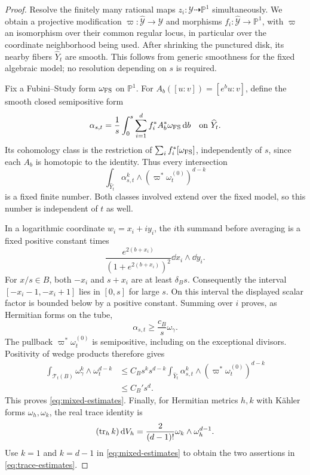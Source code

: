 \begin{proof}
Resolve the finitely many rational maps $z_i:\mathcal Y\dashrightarrow
\mathbb P^1$ simultaneously.  We obtain a projective modification
$\varpi:\widehat{\mathcal Y}\to\mathcal Y$ and morphisms
$f_i:\widehat{\mathcal Y}\to\mathbb P^1$, with $\varpi$ an isomorphism
over their common regular locus, in particular over the coordinate
neighborhood being used.  After shrinking the punctured disk, its
nearby fibers $\widehat Y_t$ are smooth.  This follows from generic
smoothness for the fixed algebraic model; no resolution depending on
$s$ is required.

Fix a Fubini--Study form $\omega_{\rm FS}$ on $\mathbb P^1$.  For
$A_b([u:v])=[e^bu:v]$, define the smooth closed semipositive form
\[
 \alpha_{s,t}=\frac1s\int_0^s\sum_{i=1}^d
                f_i^* A_b^*\omega_{\rm FS}\,\mathrm d b
 \quad\hbox{on }\widehat Y_t.
\]
Its cohomology class is the restriction of
$\sum_i f_i^*[\omega_{\rm FS}]$, independently of $s$, since each $A_b$
is homotopic to the identity.  Thus every intersection
\begin{equation}
 \int_{\widehat Y_t}\alpha_{s,t}^k\wedge
                  (\varpi^*\omega_t^{(0)})^{d-k}
 \label{eq:fixed-mixed-intersection}
\end{equation}
is a fixed finite number.  Both classes involved extend over the fixed
model, so this number is independent of $t$ as well.

In a logarithmic coordinate $w_i=x_i+iy_i$, the $i$th summand before
averaging is a fixed positive constant times
\[
 \frac{e^{2(b+x_i)}}{(1+e^{2(b+x_i)})^2}
                   \dd x_i\wedge\dd y_i.
\]
For $x/s\in B$, both $-x_i$ and $s+x_i$ are at least
$\delta_Bs$.  Consequently the interval
$[-x_i-1,-x_i+1]$ lies in $[0,s]$ for large $s$.  On this interval the
displayed scalar factor is bounded below by a positive constant.
Summing over $i$ proves, as Hermitian forms on the tube,
\[
 \alpha_{s,t}\ge\frac{c_B}{s}\omega_\gamma.
\]
The pullback $\varpi^*\omega_t^{(0)}$ is semipositive, including on the
exceptional divisors.  Positivity of wedge products therefore gives
\[
 \begin{split}
 \int_{\mathcal T_t(B)}\omega_\gamma^k\wedge\omega_t^{d-k}
 &\le C_Bs^k s^{d-k}
       \int_{\widehat Y_t}\alpha_{s,t}^k\wedge
                        (\varpi^*\omega_t^{(0)})^{d-k}\\
 &\le C_B' s^d.
 \end{split}
\]
This proves \eqref{eq:mixed-estimates}.  Finally, for Hermitian metrics
$h,k$ with K\"ahler forms $\omega_h,\omega_k$, the real trace identity is
\[
 (\operatorname{tr}_h k)\,\mathrm d V_h
       =\frac{2}{(d-1)!}\omega_k\wedge\omega_h^{d-1}.
\]
Use $k=1$ and $k=d-1$ in \eqref{eq:mixed-estimates} to obtain the two
assertions in \eqref{eq:trace-estimates}.
\end{proof}

